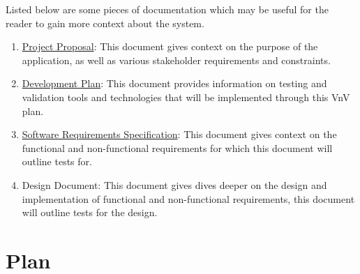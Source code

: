 \documentclass[12pt, titlepage]{article}
\begin{document}
Listed below are some pieces of documentation which may be useful for the reader to gain more context about the system.

\begin{enumerate}
    \item \href{https://github.com/RishiVaya/Lower_Earth_Orbiters/blob/main/Project%20Proposal.pdf}{Project Proposal}: This document gives context on the purpose of the application, as well as various stakeholder requirements and constraints. 
    \item \href{https://github.com/RishiVaya/Lower_Earth_Orbiters/blob/main/docs/DevelopmentPlan/Development_Plan.pdf}{Development Plan}: This document provides information on testing and validation tools and technologies that will be implemented through this VnV plan.
    \item \href{https://github.com/RishiVaya/Lower_Earth_Orbiters/blob/main/docs/SRS/SRS.pdf}{Software Requirements Specification}: This document gives context on the functional and non-functional requirements for which this document will outline tests for.
    \item Design Document: This document gives dives deeper on the design and implementation of functional and non-functional requirements, this document will outline tests for the design.
\end{enumerate}


\section{Plan}
\end{document}
